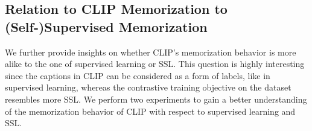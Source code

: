 

 


\subsection{Relation to CLIP Memorization to (Self-)Supervised Memorization}\label{chpt:clip_ssl_sl}
We further provide insights on whether CLIP's memorization behavior is more alike to the one of supervised learning or SSL.
This question is highly interesting since the captions in CLIP can be considered as a form of labels, like in supervised learning, whereas the contrastive training objective on the dataset resembles more SSL.
We perform two experiments to gain a better understanding of the memorization behavior of CLIP with respect to supervised learning and SSL.

